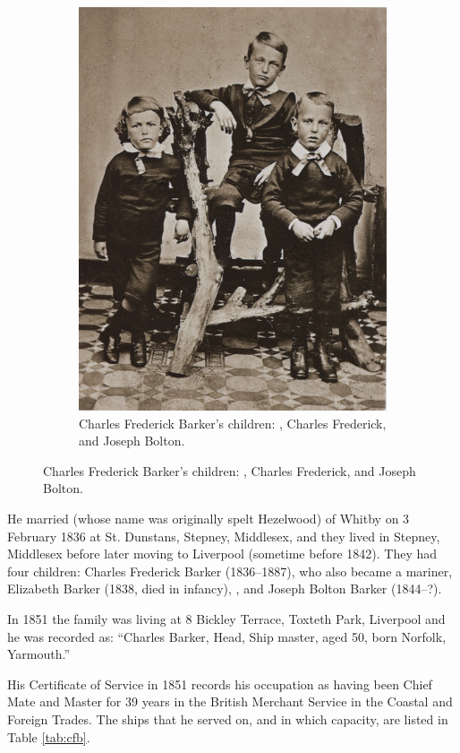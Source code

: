 \begin{figure}
\begin{subfigure}{.48\textwidth}
		\includegraphics{photos/CFB_children.png}
		\caption{Charles Frederick Barker's children: , Charles Frederick, and Joseph Bolton.}
	\end{subfigure}
\end{figure}

He married  (whose name was originally spelt Hezelwood) of Whitby on 3 February 1836 at St. Dunstans, Stepney, Middlesex, and they lived in Stepney, Middlesex before later moving to Liverpool (sometime before 1842). They had four children: Charles Frederick Barker (1836--1887), who also became a mariner, Elizabeth Barker (1838, died in infancy), , and Joseph Bolton Barker (1844--?).\cite{CFB1851}

In 1851 the family was living at 8 Bickley Terrace, Toxteth Park, Liverpool and he was recorded as:
``Charles Barker, Head, Ship master, aged 50, born Norfolk, Yarmouth.''\cite{CFB1851}

His Certificate of Service in 1851 records his occupation as having been Chief Mate and Master for 39 years in the British Merchant Service in the Coastal and Foreign Trades. The ships that he served on, and in which capacity, are listed in Table \ref{tab:cfb}.

